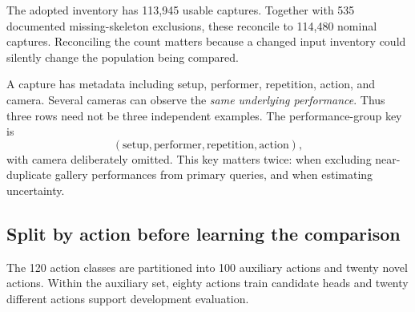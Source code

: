 The adopted inventory has 113,945 usable captures. Together with 535 documented
missing-skeleton exclusions, these reconcile to 114,480 nominal captures.
Reconciling the count matters because a changed input inventory could silently
change the population being compared.

A capture has metadata including setup, performer, repetition, action, and
camera. Several cameras can observe the \emph{same underlying performance}.
Thus three rows need not be three independent examples. The performance-group
key is
\[
  (\text{setup},\text{performer},\text{repetition},\text{action}),
\]
with camera deliberately omitted. This key matters twice: when excluding
near-duplicate gallery performances from primary queries, and when estimating
uncertainty.

\subsection{Split by action before learning the comparison}
The 120 action classes are partitioned into 100 auxiliary actions and twenty
novel actions. Within the auxiliary set, eighty actions train candidate heads
and twenty different actions support development evaluation.

\begin{center}
\end{center}

